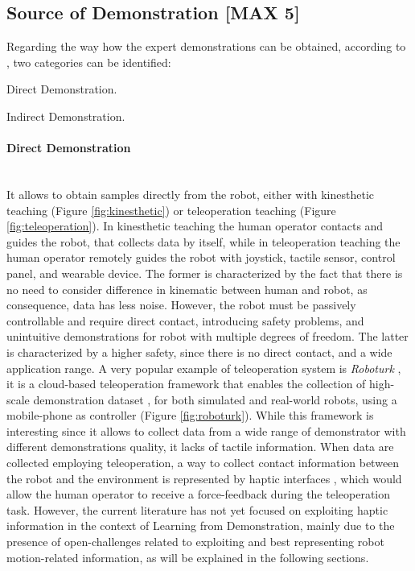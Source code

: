 \subsection{Source of Demonstration [MAX 5]}
\label{sec:source_of_demonstration}
Regarding the way how the expert demonstrations can be obtained, according to \cite{fang2019survey}, two categories can be identified: \begin{enumerate*}[label=\textbf{(\alph*)}]
    \item Direct Demonstration. 
    \item Indirect Demonstration.
\end{enumerate*}

\paragraph{Direct Demonstration}  \mbox{} \\
\noindent It allows to obtain samples directly from the robot, either with kinesthetic teaching (Figure \ref{fig:kinesthetic}) or teleoperation teaching (Figure \ref{fig:teleoperation}). In kinesthetic teaching the human operator contacts and guides the robot, that collects data by itself, while in teleoperation teaching the human operator remotely guides the robot with joystick, tactile sensor, control panel, and wearable device. 
The former is characterized by the fact that there is no need to consider difference in kinematic between human and robot, as consequence, data has less noise. However, the robot must be passively controllable and require direct contact, introducing safety problems, and unintuitive demonstrations for robot with multiple degrees of freedom.
The latter is characterized by a higher safety, since there is no direct contact, and a wide application range.
A very popular example of teleoperation system is \textit{Roboturk} \cite{mandlekar2018roboturk}, it is a cloud-based teleoperation framework that enables the collection of high-scale demonstration dataset \cite{mandlekar2019scaling,mandlekar2022matters}, for both simulated and real-world robots, using a mobile-phone as controller (Figure \ref{fig:roboturk}). While this framework is interesting since it allows to collect data from a wide range of demonstrator with different demonstrations quality, it lacks of tactile information. When data are collected employing teleoperation, a way to collect contact information between the robot and the environment is represented by haptic interfaces \cite{cyberglove,touch}, which would allow the human operator to receive a force-feedback during the teleoperation task. However, the current literature has not yet focused on exploiting haptic information in the context of Learning from Demonstration, mainly due to the presence of open-challenges related to exploiting and best representing robot motion-related information, as will be explained in the following sections.

